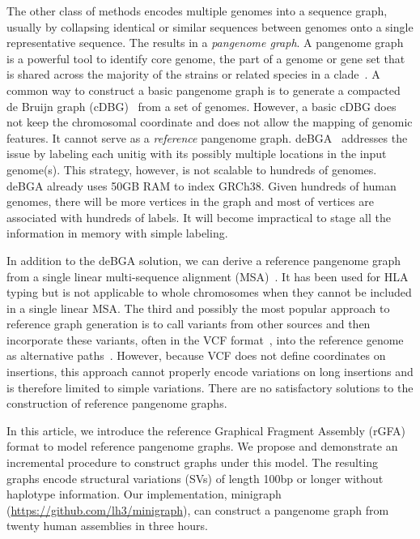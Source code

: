 \documentclass[twocolumn]{bmcart}%
\begin{document}
The other class of methods encodes multiple genomes into a sequence graph,
usually by collapsing identical or similar sequences between genomes onto a
single representative sequence. The results in a \emph{pangenome graph}. A
pangenome graph is a powerful tool to identify core genome, the part of a
genome or gene set that is shared across the majority of the strains or related species
in a clade~\cite{Vernikos:2015aa}. A common way to construct a basic pangenome
graph is to generate a compacted de Bruijn graph
(cDBG)~\cite{Marcus:2014xy,Baier_2015,Beller:2016ab,Minkin_2016,Chikhi_2016}
from a set of genomes. However, a basic cDBG does not keep the chromosomal
coordinate and does not allow the mapping of genomic features. It cannot serve
as a \emph{reference} pangenome graph. deBGA~\cite{Liu:2016ac} addresses the
issue by labeling each unitig with its possibly multiple locations in the input
genome(s). This strategy, however, is not scalable to hundreds of genomes.
deBGA already uses 50GB RAM to index GRCh38. Given hundreds of human genomes,
there will be more vertices in the graph and most of vertices are associated
with hundreds of labels. It will become impractical to stage all the
information in memory with simple labeling.

In addition to the deBGA solution, we can derive a reference pangenome
graph from a single linear multi-sequence alignment (MSA)~\cite{Dilthey_2015,Dilthey_2019}.
It has been used for HLA typing but is not applicable to whole chromosomes when
they cannot be included in a single linear MSA. The third and possibly the most
popular approach to reference graph generation is to call variants from other
sources and then incorporate these variants, often in the VCF format~\cite{Danecek:2011qy}, into
the reference genome as alternative
paths~\cite{Eggertsson:2017aa,Rakocevic_2019,Garrison:2018aa,Sibbesen:2018aa,Biederstedt:2018aa,Eggertsson_2019}.
However, because VCF does not define coordinates on insertions, this approach
cannot properly encode variations on long insertions and is therefore limited
to simple variations. There are no satisfactory solutions to the construction
of reference pangenome graphs.

In this article, we introduce the reference Graphical Fragment Assembly (rGFA)
format to model reference pangenome graphs. We propose and demonstrate an
incremental procedure to construct graphs under this model. The resulting
graphs encode structural variations (SVs) of length 100bp or longer without haplotype
information.  Our implementation, minigraph
(\href{https://github.com/lh3/minigraph}{https://github.com/lh3/minigraph}),
can construct a pangenome graph from twenty human assemblies in three hours.
\end{document}
